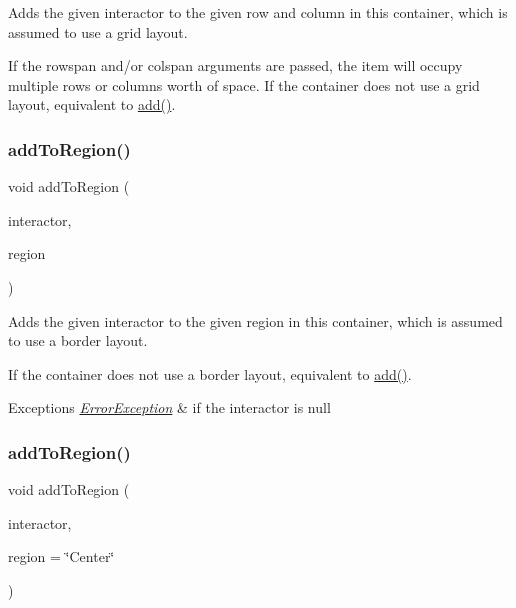 Adds the given interactor to the given row and column in this container, which is assumed to use a grid layout. 

If the rowspan and/or colspan arguments are passed, the item will occupy multiple rows or columns\textquotesingle{} worth of space. If the container does not use a grid layout, equivalent to \mbox{\hyperlink{classGContainer_a6f99b7c841256dbdc5acaafbbca4e685}{add()}}. \mbox{\label{classGContainer_aab55413917cdbb2e0560ab415d59fd1f}} 
\subsubsection{\texorpdfstring{add\+To\+Region()}{addToRegion()}\hspace{0.1cm}{\footnotesize\ttfamily [1/4]}}
{\footnotesize\ttfamily void add\+To\+Region (\begin{DoxyParamCaption}\item[{\mbox{\hyperlink{classGInteractor}{G\+Interactor}} $\ast$}]{interactor,  }\item[{\mbox{\hyperlink{classGContainer_a81a01a86de31071a92e6cce0bab9bc4b}{Region}}}]{region }\end{DoxyParamCaption})\hspace{0.3cm}{\ttfamily [virtual]}}



Adds the given interactor to the given region in this container, which is assumed to use a border layout. 

If the container does not use a border layout, equivalent to \mbox{\hyperlink{classGContainer_a6f99b7c841256dbdc5acaafbbca4e685}{add()}}. 
\begin{DoxyExceptions}{Exceptions}
{\em \mbox{\hyperlink{classErrorException}{Error\+Exception}}} & if the interactor is null \\
\hline
\end{DoxyExceptions}
\mbox{\label{classGContainer_a9c8e600889001e6e72d3548918a6baff}} 
\subsubsection{\texorpdfstring{add\+To\+Region()}{addToRegion()}\hspace{0.1cm}{\footnotesize\ttfamily [2/4]}}
{\footnotesize\ttfamily void add\+To\+Region (\begin{DoxyParamCaption}\item[{\mbox{\hyperlink{classGInteractor}{G\+Interactor}} $\ast$}]{interactor,  }\item[{const std\+::string \&}]{region = {\ttfamily \char`\"{}Center\char`\"{}} }\end{DoxyParamCaption})\hspace{0.3cm}{\ttfamily [virtual]}}



